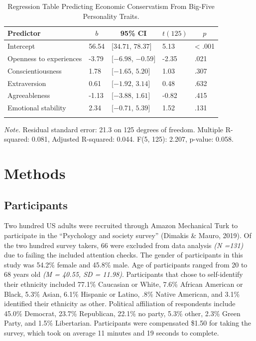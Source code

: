 \documentclass[man]{apa6}
\begin{document}
\begin{table}[tbp]
\begin{center}
\begin{threeparttable}
\caption{\label{tab:linearmodels_conservatism_ocean_tables}Regression Table Predicting Economic Conservatism From Big-Five Personality Traits.}
\begin{tabular}{lllll}
\toprule
Predictor & \multicolumn{1}{c}{$b$} & \multicolumn{1}{c}{95\% CI} & \multicolumn{1}{c}{$t(125)$} & \multicolumn{1}{c}{$p$}\\
\midrule
Intercept & 56.54 & $[34.71$, $78.37]$ & 5.13 & < .001\\
Openness to experiences & -3.79 & $[-6.98$, $-0.59]$ & -2.35 & .021\\
Conscientiousness & 1.78 & $[-1.65$, $5.20]$ & 1.03 & .307\\
Extraversion & 0.61 & $[-1.92$, $3.14]$ & 0.48 & .632\\
Agreeableness & -1.13 & $[-3.88$, $1.61]$ & -0.82 & .415\\
Emotional stability & 2.34 & $[-0.71$, $5.39]$ & 1.52 & .131\\
\bottomrule
\addlinespace
\end{tabular}
\begin{tablenotes}[para]
\normalsize{\textit{Note.} Residual standard error: 21.3 on 125 degrees of freedom. Multiple R-squared: 0.081, Adjusted R-squared: 0.044. F(5, 125): 2.207, p-value: 0.058.}
\end{tablenotes}
\end{threeparttable}
\end{center}
\end{table}

\hypertarget{methods}{%
\section{Methods}\label{methods}}

\hypertarget{participants}{%
\subsection{Participants}\label{participants}}

Two hundred US adults were recruited through Amazon Mechanical Turk to participate in the \enquote{Psychology and society survey} (Dimakis \& Mauro, 2019). Of the two hundred survey takers, 66 were excluded from data analysis \emph{(N =131)} due to failing the included attention checks. The gender of participants in this study was 54.2\% female and 45.8\% male. Age of participants ranged from 20 to 68 years old \emph{(M = 40.55, SD = 11.98)}. Participants that chose to self-identify their ethnicity included 77.1\% Caucasian or White, 7.6\% African American or Black, 5.3\% Asian, 6.1\% Hispanic or Latino, .8\% Native American, and 3.1\% identified their ethnicity as other. Political affiliation of respondents include 45.0\% Democrat, 23.7\% Republican, 22.1\% no party, 5.3\% other, 2.3\% Green Party, and 1.5\% Libertarian. Participants were compensated \$1.50 for taking the survey, which took on average 11 minutes and 19 seconds to complete.
\end{document}
